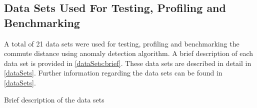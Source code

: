 \subsection{Data Sets Used For Testing, Profiling and Benchmarking}
\label{software:datasets}
A total of 21 data sets were used for testing, profiling and benchmarking the
commute distance using anomaly detection algorithm. A brief description of each
data set is provided in \autoref{dataSets:brief}. These data sets are
described in detail in \autoref{dataSets}. Further information regarding the
data sets can be found in \autoref{dataSets}.

\begin{table}
    \centering
    \begin{datasets}
    \end{datasets}
    \caption{Brief description of the data sets}
    \label{dataSets:brief}
\end{table}